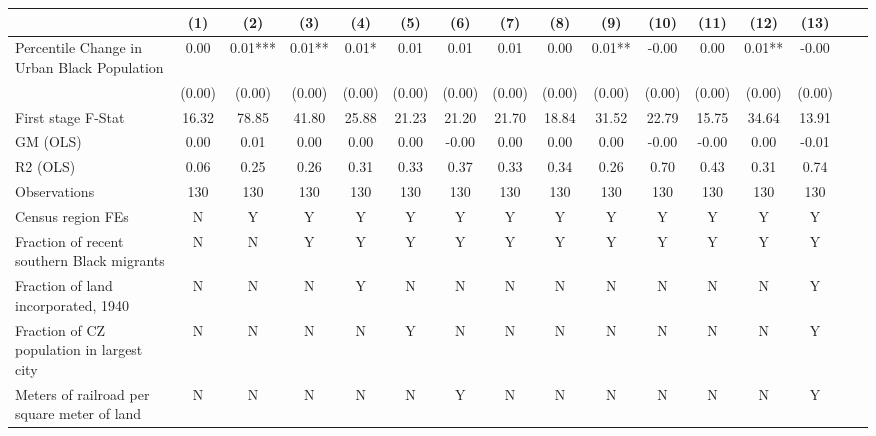 \begin{tabular}{l*{15}{c}} \toprule
                    &\multicolumn{1}{c}{(1)}   &\multicolumn{1}{c}{(2)}   &\multicolumn{1}{c}{(3)}   &\multicolumn{1}{c}{(4)}   &\multicolumn{1}{c}{(5)}   &\multicolumn{1}{c}{(6)}   &\multicolumn{1}{c}{(7)}   &\multicolumn{1}{c}{(8)}   &\multicolumn{1}{c}{(9)}   &\multicolumn{1}{c}{(10)}   &\multicolumn{1}{c}{(11)}   &\multicolumn{1}{c}{(12)}   &\multicolumn{1}{c}{(13)}   \\
\midrule
Percentile Change in Urban Black Population&  0.00   &  0.01***&  0.01** &  0.01*  &  0.01   &  0.01   &  0.01   &  0.00   &  0.01** & -0.00   &  0.00   &  0.01** & -0.00   \\
                    &(0.00)   &(0.00)   &(0.00)   &(0.00)   &(0.00)   &(0.00)   &(0.00)   &(0.00)   &(0.00)   &(0.00)   &(0.00)   &(0.00)   &(0.00)   \\
\midrule
First stage F-Stat  & 16.32   & 78.85   & 41.80   & 25.88   & 21.23   & 21.20   & 21.70   & 18.84   & 31.52   & 22.79   & 15.75   & 34.64   & 13.91   \\
GM (OLS)            &  0.00   &  0.01   &  0.00   &  0.00   &  0.00   & -0.00   &  0.00   &  0.00   &  0.00   & -0.00   & -0.00   &  0.00   & -0.01   \\
R2 (OLS)            &  0.06   &  0.25   &  0.26   &  0.31   &  0.33   &  0.37   &  0.33   &  0.34   &  0.26   &  0.70   &  0.43   &  0.31   &  0.74   \\
Observations        &   130   &   130   &   130   &   130   &   130   &   130   &   130   &   130   &   130   &   130   &   130   &   130   &   130   \\
Census region FEs   &     N   &     Y   &     Y   &     Y   &     Y   &     Y   &     Y   &     Y   &     Y   &     Y   &     Y   &     Y   &     Y   \\
Fraction of recent southern Black migrants&     N   &     N   &     Y   &     Y   &     Y   &     Y   &     Y   &     Y   &     Y   &     Y   &     Y   &     Y   &     Y   \\
Fraction of land incorporated, 1940&     N   &     N   &     N   &     Y   &     N   &     N   &     N   &     N   &     N   &     N   &     N   &     N   &     Y   \\
Fraction of CZ population in largest city&     N   &     N   &     N   &     N   &     Y   &     N   &     N   &     N   &     N   &     N   &     N   &     N   &     Y   \\
Meters of railroad per square meter of land&     N   &     N   &     N   &     N   &     N   &     Y   &     N   &     N   &     N   &     N   &     N   &     N   &     Y   \\

\end{tabular}
